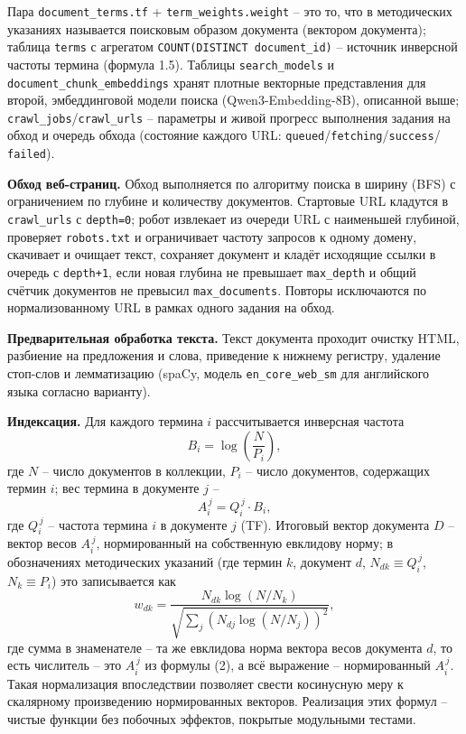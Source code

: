 
Пара \texttt{document\_terms.tf} + \texttt{term\_weights.weight} -- это
то, что в методических указаниях называется поисковым образом документа
(вектором документа); таблица \texttt{terms} с агрегатом
\texttt{COUNT(DISTINCT document\_id)} -- источник инверсной частоты
термина (формула 1.5). Таблицы \texttt{search\_models} и
\texttt{document\_chunk\_embeddings} хранят плотные векторные
представления для второй, эмбеддинговой модели поиска (Qwen3-Embedding-8B),
описанной выше; \texttt{crawl\_jobs}/\texttt{crawl\_urls} -- параметры и
живой прогресс выполнения задания на обход и очередь обхода (состояние
каждого URL: \texttt{queued}/\texttt{fetching}/\texttt{success}/
\texttt{failed}).


\textbf{Обход веб-страниц.} Обход выполняется по алгоритму поиска в
ширину (BFS) с ограничением по глубине и количеству документов.
Стартовые URL кладутся в \texttt{crawl\_urls} с \texttt{depth=0}; робот
извлекает из очереди URL с наименьшей глубиной, проверяет
\texttt{robots.txt} и ограничивает частоту запросов к одному домену,
скачивает и очищает текст, сохраняет документ и кладёт исходящие ссылки
в очередь с \texttt{depth+1}, если новая глубина не превышает
\texttt{max\_depth} и общий счётчик документов не превысил
\texttt{max\_documents}. Повторы исключаются по нормализованному URL в
рамках одного задания на обход.

\textbf{Предварительная обработка текста.} Текст документа проходит
очистку HTML, разбиение на предложения и слова, приведение к нижнему
регистру, удаление стоп-слов и лемматизацию (spaCy, модель
\texttt{en\_core\_web\_sm} для английского языка согласно варианту).

\textbf{Индексация.} Для каждого термина $i$ рассчитывается инверсная
частота
\begin{equation}
  B_i = \log\!\left(\frac{N}{P_i}\right),
\end{equation}
где $N$ -- число документов в коллекции, $P_i$ -- число документов,
содержащих термин $i$; вес термина в документе $j$ --
\begin{equation}
  A_i^{\,j} = Q_i^{\,j} \cdot B_i,
\end{equation}
где $Q_i^{\,j}$ -- частота термина $i$ в документе $j$ (TF). Итоговый
вектор документа $D$ -- вектор весов $A_i^{\,j}$, нормированный на
собственную евклидову норму; в обозначениях методических указаний (где
термин $k$, документ $d$, $N_{dk} \equiv Q_i^{\,j}$, $N_k \equiv P_i$)
это записывается как
\begin{equation}
  w_{dk} = \frac{N_{dk}\log(N / N_k)}{\sqrt{\sum_j \left(N_{dj}\log(N / N_j)\right)^2}},
\end{equation}
где сумма в знаменателе -- та же евклидова норма вектора весов документа
$d$, то есть числитель -- это $A_i^{\,j}$ из формулы (2), а всё выражение
-- нормированный $A_i^{\,j}$. Такая нормализация впоследствии позволяет
свести косинусную меру к скалярному произведению нормированных векторов.
Реализация этих формул -- чистые функции без побочных эффектов, покрытые
модульными тестами.

